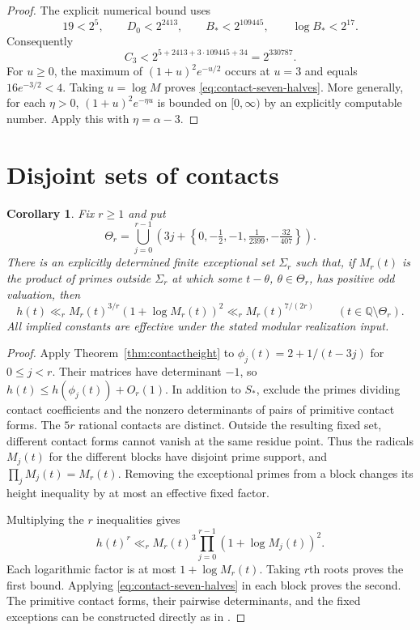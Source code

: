 \documentclass[11pt,a4paper]{article}
\newtheorem{corollary}[theorem]{Corollary}
\theoremstyle{definition}
\newcommand{\Q}{\mathbb Q}
\begin{document}
\begin{proof}
The explicit numerical bound uses
\[
 19<2^5,\qquad D_0<2^{2413},\qquad
 B_*<2^{109445},\qquad \log B_*<2^{17}.
\]
Consequently
\[
 C_3<2^{5+2413+3\cdot109445+34}=2^{330787}.
\]
For $u\ge0$, the maximum of $(1+u)^2e^{-u/2}$ occurs at
$u=3$ and equals $16e^{-3/2}<4$. Taking $u=\log M$ proves
\eqref{eq:contact-seven-halves}.
More generally, for each $\eta>0$,
$(1+u)^2e^{-\eta u}$ is bounded on $[0,\infty)$ by an explicitly
computable number. Apply this with $\eta=\alpha-3$.
\end{proof}

\section{Disjoint sets of contacts}

\begin{corollary}\label{cor:amplification}
Fix $r\ge1$ and put
\[
 \Theta_r=\bigcup_{j=0}^{r-1}
 \left(3j+\left\{0,-\tfrac12,-1,
                     \tfrac1{2399},-\tfrac{32}{407}\right\}\right).
\]
There is an explicitly determined finite exceptional set $\Sigma_r$
such that, if $M_r(t)$ is the product of primes outside $\Sigma_r$
at which some $t-\theta$, $\theta\in\Theta_r$, has positive odd
valuation, then
\[
 h(t)\ll_r M_r(t)^{3/r}(1+\log M_r(t))^2
       \ll_r M_r(t)^{7/(2r)}
       \qquad(t\in\Q\setminus\Theta_r).
\]
All implied constants are effective under the stated modular
realization input.
\end{corollary}
\begin{proof}
Apply Theorem~\ref{thm:contactheight} to
$\phi_j(t)=2+1/(t-3j)$ for $0\le j<r$.
Their matrices have determinant $-1$, so
$h(t)\le h(\phi_j(t))+O_r(1)$.
In addition to $S_*$, exclude the primes dividing contact
coefficients and the nonzero determinants of pairs of primitive
contact forms. The $5r$ rational contacts are distinct.
Outside the resulting fixed set, different contact forms cannot
vanish at the same residue point. Thus the radicals $M_j(t)$
for the different blocks have disjoint prime support, and
$\prod_jM_j(t)=M_r(t)$. Removing the exceptional primes from
a block changes its height inequality by at most an effective
fixed factor.

Multiplying the $r$ inequalities gives
\[
 h(t)^r\ll_r M_r(t)^3
                  \prod_{j=0}^{r-1}(1+\log M_j(t))^2.
\]
Each logarithmic factor is at most $1+\log M_r(t)$.
Taking $r$th roots proves the first bound. Applying
\eqref{eq:contact-seven-halves} in each block proves the second.
The primitive contact forms, their pairwise determinants, and the
fixed exceptions can be constructed directly as in
\cite[Sections~1--2]{Amplification}.
\end{proof}
\end{document}

